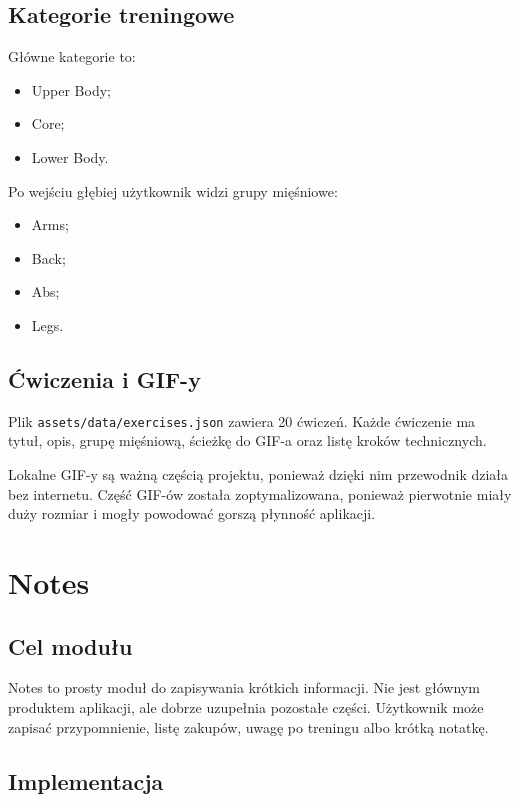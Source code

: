 \documentclass[12pt,a4paper]{article}
\begin{document}
\subsection{Kategorie treningowe}

Główne kategorie to:

\begin{itemize}
    \item Upper Body;
    \item Core;
    \item Lower Body.
\end{itemize}

Po wejściu głębiej użytkownik widzi grupy mięśniowe:

\begin{itemize}
    \item Arms;
    \item Back;
    \item Abs;
    \item Legs.
\end{itemize}

\subsection{Ćwiczenia i GIF-y}

Plik \texttt{assets/data/exercises.json} zawiera 20 ćwiczeń. Każde ćwiczenie ma tytuł, opis, grupę mięśniową, ścieżkę do GIF-a oraz listę kroków technicznych.

Lokalne GIF-y są ważną częścią projektu, ponieważ dzięki nim przewodnik działa bez internetu. Część GIF-ów została zoptymalizowana, ponieważ pierwotnie miały duży rozmiar i mogły powodować gorszą płynność aplikacji.

\section{Notes}

\subsection{Cel modułu}

Notes to prosty moduł do zapisywania krótkich informacji. Nie jest głównym produktem aplikacji, ale dobrze uzupełnia pozostałe części. Użytkownik może zapisać przypomnienie, listę zakupów, uwagę po treningu albo krótką notatkę.

\subsection{Implementacja}
\end{document}
